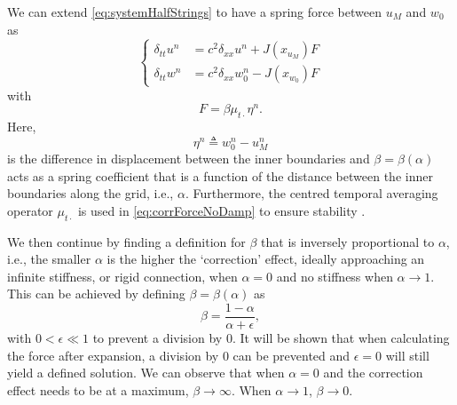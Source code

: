 We can extend \eqref{eq:systemHalfStrings} to have a spring force between $u_M$ and $w_0$ as
\begin{equation}\label{eq:dispCorrSyst}
    \begin{cases}
        \delta_{tt}u^n &= c^2\delta_{xx}u^n + J(x_{u_M})F\\
        \delta_{tt}w^n &= c^2\delta_{xx}w_0^n - J(x_{w_0})F
    \end{cases}
\end{equation}
with 
\begin{equation}\label{eq:corrForceNoDamp}
    F = \beta \mu_{t\cdot}\eta^n.
\end{equation}
Here,
\begin{equation}\label{eq:etaCorrDef}
    \eta^n \triangleq w_0^n - u_M^n
\end{equation}
is the difference in displacement between the inner boundaries
and $\beta = \beta(\alpha)$ 
acts as a spring coefficient that is a function of the distance between the inner boundaries along the grid, i.e., $\alpha$. Furthermore, the centred temporal averaging operator $\mu_{t\cdot}$ is used in \eqref{eq:corrForceNoDamp} to ensure stability \cite{Bilbao2009Modular}.

We then continue by finding a definition for $\beta$ that is inversely proportional to $\alpha$, i.e., the smaller $\alpha$ is the higher the `correction' effect, ideally approaching an infinite stiffness, or rigid connection, when $\alpha = 0$ and no stiffness when $\alpha \rightarrow 1$. This can be achieved by defining $\beta = \beta(\alpha)$ as
\def\plusEps{+ \epsilon}
\def\alfPlusEps{(\alpha \plusEps)}
\begin{equation}\label{eq:betaDef}
    \beta = \frac{1 - \alpha}{\alpha \plusEps},
\end{equation}
with $0<\epsilon \ll 1$ to prevent a division by 0. It will be shown that when calculating the force after expansion, a division by 0 can be prevented and $\epsilon = 0$ will still yield a defined solution. We can observe that when $\alpha = 0$ and the correction effect needs to be at a maximum, $\beta\rightarrow \infty$. When $\alpha \rightarrow 1$, $\beta \rightarrow 0$.

